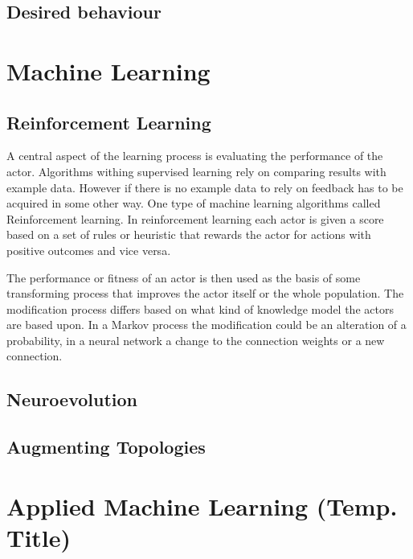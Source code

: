 \subsection{Desired behaviour}

    
\section{Machine Learning}

\subsection{Reinforcement Learning}
A central aspect of the learning process is evaluating the performance of the actor. Algorithms withing supervised learning rely on comparing results with example data. However if there is no example data to rely on feedback has to be acquired in some other way. One type of machine learning algorithms called Reinforcement learning. In reinforcement learning each actor is given a score based on a set of rules or heuristic that rewards the actor for actions with positive outcomes and vice versa.

The performance or fitness of an actor is then used as the basis of some transforming process that improves the actor itself or the whole population. The modification process differs based on what kind of knowledge model the actors are based upon. In a Markov process the modification could be an alteration of a probability, in a neural network a change to the connection weights or a new connection.  

\subsection{Neuroevolution}


\subsection{Augmenting Topologies}


\section{Applied Machine Learning (Temp. Title)}


